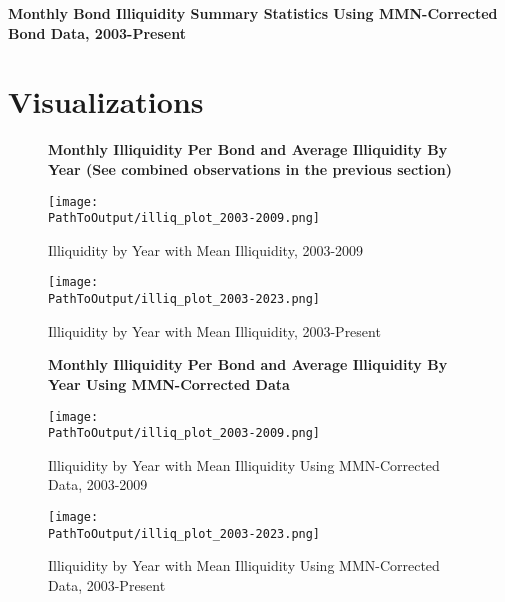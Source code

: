 \documentclass{article}
\newcommand*{\PathToOutput}{../output/}%
\begin{document}
\begin{table}[hbt!]
\centering
\textbf{\large Monthly Bond Illiquidity Summary Statistics Using MMN-Corrected Bond Data, 2003-Present}
\resizebox{\textwidth}{!}{%
    
}
\label{table: illiq_daily_summary_mmn_new}
\end{table}


\section{Visualizations}

\begin{figure}[hbt!]
\centering
\textbf{\large Monthly Illiquidity Per Bond and Average Illiquidity By Year (See combined observations in the previous section)}
\caption{Illiquidity by Year with Mean Illiquidity, 2003-2009}
  \centering
  \texttt{[image: \\PathToOutput/illiq\_plot\_2003-2009.png]}

\label{fig:illiq_plot_2003-2009}
\end{figure}


\begin{figure}[hbt!]
\centering
\caption{Illiquidity by Year with Mean Illiquidity, 2003-Present}
  \centering
  \texttt{[image: \\PathToOutput/illiq\_plot\_2003-2023.png]}

\label{fig:illiq_plot_2003-2023}
\end{figure}



\begin{figure}[hbt!]
\centering
\textbf{\large Monthly Illiquidity Per Bond and Average Illiquidity By Year Using MMN-Corrected Data}
\caption{Illiquidity by Year with Mean Illiquidity Using MMN-Corrected Data, 2003-2009}
  \centering
  \texttt{[image: \\PathToOutput/illiq\_plot\_2003-2009.png]}

\label{fig:illiq_plot_2003-2009}
\end{figure}


\begin{figure}[hbt!]
\centering
\caption{Illiquidity by Year with Mean Illiquidity Using MMN-Corrected Data, 2003-Present}
  \centering
  \texttt{[image: \\PathToOutput/illiq\_plot\_2003-2023.png]}

\label{fig:illiq_plot_2003-2023}
\end{figure}
\end{document}
